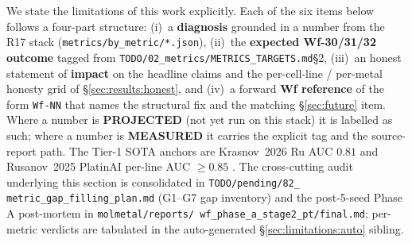 We state the limitations of this work explicitly.  Each of the six
items below follows a four-part structure: (i)~a \textbf{diagnosis}
grounded in a \MEASURED{} number from the R17 stack
(\texttt{metrics/by\_metric/*.json}),
(ii)~the \textbf{expected Wf-30/31/32 outcome} tagged
\PROJECTED{} from \texttt{TODO/02\_metrics/METRICS\_TARGETS.md}\S2,
(iii)~an honest statement of \textbf{impact} on the headline claims
and the per-cell-line / per-metal honesty grid of
\S\ref{sec:results:honest}, and (iv)~a forward \textbf{Wf reference}
of the form \texttt{Wf-NN} that names the structural fix and the
matching \S\ref{sec:future} item.  Where a number is
\textbf{PROJECTED} (not yet run on this stack) it is labelled as
such; where a number is \textbf{MEASURED} it carries the explicit
\MEASURED{} tag and the source-report path.  The Tier-1 SOTA anchors
are Krasnov~2026 Ru AUC $0.81$
\citep{krasnov2026metalcytotoxdb} and Rusanov~2025 PlatinAI per-line
AUC $\geq 0.85$ \citep{rusanov2025platinai}.  The cross-cutting audit
underlying this section is consolidated in \texttt{TODO/pending/82\_
metric\_gap\_filling\_plan.md} (G1--G7 gap inventory) and the
post-5-seed Phase A post-mortem in \texttt{molmetal/reports/
wf\_phase\_a\_stage2\_pt/final.md}; per-metric verdicts are tabulated
in the auto-generated \S\ref{sec:limitations:auto} sibling.

